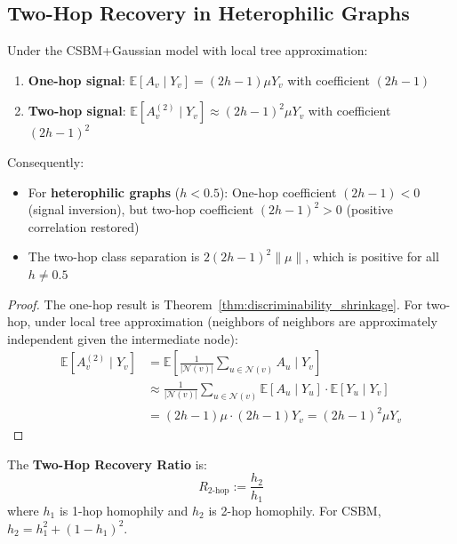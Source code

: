 \subsection{Two-Hop Recovery in Heterophilic Graphs}
\label{subsec:2hop}

\begin{theorem}
\label{thm:2hop_recovery}
Under the CSBM+Gaussian model with local tree approximation:
\begin{enumerate}
    \item \textbf{One-hop signal}: $\mathbb{E}[A_v \mid Y_v] = (2h - 1) \mu Y_v$ with coefficient $(2h - 1)$
    \item \textbf{Two-hop signal}: $\mathbb{E}[A_v^{(2)} \mid Y_v] \approx (2h - 1)^2 \mu Y_v$ with coefficient $(2h - 1)^2$
\end{enumerate}
Consequently:
\begin{itemize}
    \item For \textbf{heterophilic graphs} ($h < 0.5$): One-hop coefficient $(2h - 1) < 0$ (signal inversion), but two-hop coefficient $(2h - 1)^2 > 0$ (positive correlation restored)
    \item The two-hop class separation is $2(2h - 1)^2 \|\mu\|$, which is positive for all $h \neq 0.5$
\end{itemize}
\end{theorem}

\begin{proof}
The one-hop result is Theorem~\ref{thm:discriminability_shrinkage}. For two-hop, under local tree approximation (neighbors of neighbors are approximately independent given the intermediate node):
\begin{align}
    \mathbb{E}[A_v^{(2)} \mid Y_v] &= \mathbb{E}\left[\frac{1}{|\mathcal{N}(v)|} \sum_{u \in \mathcal{N}(v)} A_u \mid Y_v\right] \\
    &\approx \frac{1}{|\mathcal{N}(v)|} \sum_{u \in \mathcal{N}(v)} \mathbb{E}[A_u \mid Y_u] \cdot \mathbb{E}[Y_u \mid Y_v] \\
    &= (2h - 1) \mu \cdot (2h - 1) Y_v = (2h - 1)^2 \mu Y_v
\end{align}
\end{proof}

\begin{definition}
\label{def:2hop_ratio}
The \textbf{Two-Hop Recovery Ratio} is:
\begin{equation}
    R_{\text{2-hop}} := \frac{h_2}{h_1}
\end{equation}
where $h_1$ is 1-hop homophily and $h_2$ is 2-hop homophily. For CSBM, $h_2 = h_1^2 + (1 - h_1)^2$.
\end{definition}

